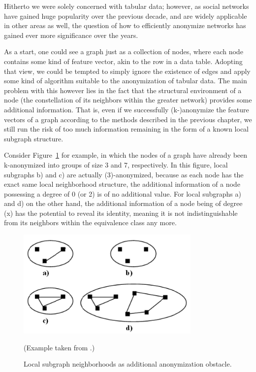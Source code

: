 \documentclass{llncs}
\begin{document}
Hitherto we were solely concerned with tabular data; however, as social networks have gained huge popularity over the previous decade, and are widely applicable in other areas as well, the question of how to efficiently anonymize networks has gained ever more significance over the years.

As a start, one could see a graph just as a collection of nodes, where each node contains some kind of feature vector, akin to the row in a data table. Adopting that view, we could be tempted to simply ignore the existence of edges and apply some kind of algorithm suitable to the anonymization of tabular data. The main problem with this however lies in the fact that the structural environment of a node (the constellation of its neighbors within the greater network) provides some additional information. That is, even if we successfully (k-)anonymize the feature vectors of a graph according to the methods described in the previous chapter, we still run the risk of too much information remaining in the form of a known local subgraph structure.

Consider Figure~\ref{fig:anon_sn_problem} for example, in which the nodes of a graph have already been k-anonymized into groups of size 3 and 7, respectively. In this figure, local subgraphs b) and c) are actually (3)-anonymized, because as each node has the exact same local neighborhood structure, the additional information of a node possessing a degree of 0 (or 2) is of no additional value. For local subgraphs a) and d) on the other hand, the additional information of a node being of degree (x) has the potential to reveal its identity, meaning it is not indistinguishable from its neighbors within the equivalence class any more.

\begin{figure}[!t]
	\begin{center}
		\includegraphics[width=0.8\textwidth]{figures/anonym/sn_problem}
		\caption{Local subgraph neighborhoods as additional anonymization obstacle.}
		\label{fig:anon_sn_problem}
	\end{center}
	\small
	(Example taken from \cite{campan2009data}.)
\end{figure}
\end{document}
